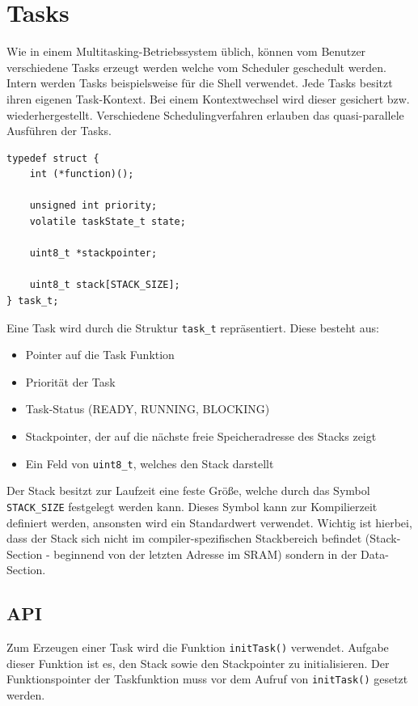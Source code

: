 \documentclass[fontsize=12pt, toc=bibliography, notitlepage]{scrreprt}
\begin{document}
\chapter{Tasks}
\label{chap:tasks}
Wie in einem Multitasking-Betriebssystem üblich, können vom Benutzer verschiedene Tasks erzeugt werden welche vom Scheduler geschedult werden. Intern werden Tasks beispielsweise für die Shell verwendet. Jede Tasks besitzt ihren eigenen Task-Kontext. Bei einem Kontextwechsel wird dieser gesichert bzw. wiederhergestellt. Verschiedene Schedulingverfahren erlauben das quasi-parallele Ausführen der Tasks.

\begin{lstlisting}[title=task.h]
typedef struct {
	int (*function)();

	unsigned int priority;
	volatile taskState_t state;

	uint8_t *stackpointer;

	uint8_t stack[STACK_SIZE];
} task_t;
\end{lstlisting}

Eine Task wird durch die Struktur \lstinline$task_t$ repräsentiert. Diese besteht aus:

\begin{itemize}
	\item Pointer auf die Task Funktion
	\item Priorität der Task
	\item Task-Status (READY, RUNNING, BLOCKING)
	\item Stackpointer, der auf die nächste freie Speicheradresse des Stacks zeigt
	\item Ein Feld von \lstinline$uint8_t$, welches den Stack darstellt
\end{itemize}

Der Stack besitzt zur Laufzeit eine feste Größe, welche durch das Symbol \lstinline$STACK_SIZE$ festgelegt werden kann. Dieses Symbol kann zur Kompilierzeit definiert werden, ansonsten wird ein Standardwert verwendet. Wichtig ist hierbei, dass der Stack sich nicht im compiler-spezifischen Stackbereich befindet (Stack-Section - beginnend von der letzten Adresse im SRAM) sondern in der Data-Section.

\section{API}
\label{subsec:tasks-api}
Zum Erzeugen einer Task wird die Funktion \lstinline$initTask()$ verwendet. Aufgabe dieser Funktion ist es, den Stack sowie den Stackpointer zu initialisieren. Der Funktionspointer der Taskfunktion muss vor dem Aufruf von \lstinline$initTask()$ gesetzt werden.
\end{document}
